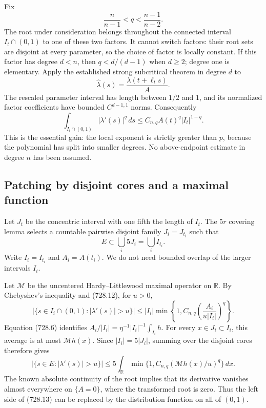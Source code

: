 \documentclass[11pt,a4paper]{article}
\theoremstyle{remark}
\begin{document}
Fix
\[
 \frac{n}{n-1}<q<\frac{n-1}{n-2}.
 \tag{728.11}
\]
The root under consideration belongs throughout the connected interval
$I_t\cap(0,1)$ to one of these two factors.  It cannot switch factors:
their root sets are disjoint at every parameter, so the choice of factor
is locally constant.  If this factor has degree $d<n$, then
$q<d/(d-1)$ when $d\ge2$; degree one is elementary.  Apply the established
strong subcritical theorem in degree $d$ to
\[
 \widehat\lambda(s)=\frac{\lambda(t+\ell_ts)}{A}.
\]
The rescaled parameter interval has length between $1/2$ and $1$, and
its normalized factor coefficients have bounded $C^{d-1,1}$ norms.
Consequently
\[
 \int_{I_t\cap(0,1)}|\lambda'(s)|^q\,ds
       \le C_{n,q} A(t)^q |I_t|^{1-q}.
 \tag{728.12}
\]
This is the essential gain: the local exponent is strictly greater than
$p$, because the polynomial has split into smaller degrees.  No
above-endpoint estimate in degree $n$ has been assumed.

\subsection{Patching by disjoint cores and a maximal function}

Let $J_t$ be the concentric interval with one fifth the length of $I_t$.
The $5r$ covering lemma selects a countable pairwise disjoint family
$J_i=J_{t_i}$ such that
\[
 E\subset\bigcup_i5J_i=\bigcup_iI_{t_i}.
\]
Write $I_i=I_{t_i}$ and $A_i=A(t_i)$.  We do not need bounded overlap of
the larger intervals $I_i$.

Let $\mathcal M$ be the uncentered Hardy--Littlewood maximal operator on
$\mathbb R$.  By Chebyshev's inequality and (728.12), for $u>0$,
\[
 \big|\{s\in I_i\cap(0,1):|\lambda'(s)|>u\}\big|
 \le |I_i|\min\left\{1,
       C_{n,q}\left(\frac{A_i}{u|I_i|}\right)^q\right\}.
\]
Equation (728.6) identifies
$A_i/|I_i|=\eta^{-1}|I_i|^{-1}\int_{I_i}h$.
For every $x\in J_i\subset I_i$, this average is at most
$\mathcal Mh(x)$.  Since $|I_i|=5|J_i|$, summing over the disjoint cores
therefore gives
\[
 \big|\{s\in E:|\lambda'(s)|>u\}\big|
 \le5\int_{\mathbb R}
           \min\{1,C_{n,q}(\mathcal Mh(x)/u)^q\}\,dx.
 \tag{728.13}
\]
The known absolute continuity of the root implies that its derivative
vanishes almost everywhere on $\{A=0\}$, where the transformed root is
zero.  Thus the left side of (728.13) can be replaced by the distribution
function on all of $(0,1)$.
\end{document}
